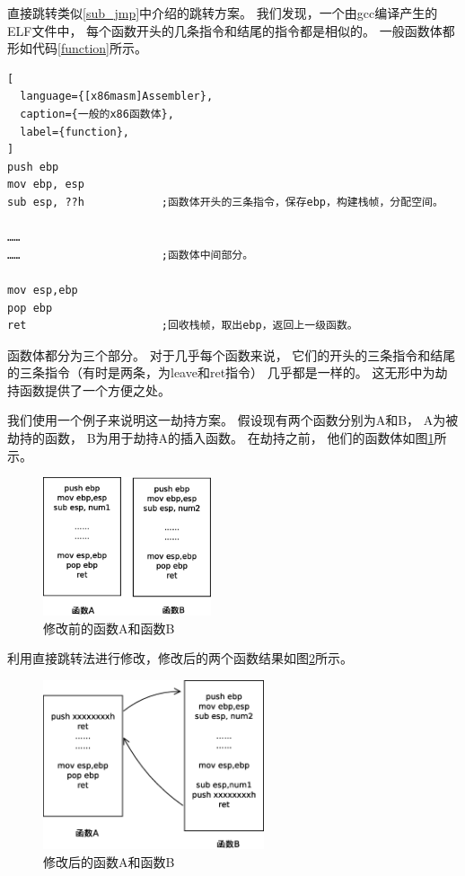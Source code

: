 直接跳转类似\ref{sub_jmp}中介绍的跳转方案。
我们发现，一个由gcc编译产生的ELF文件中，
每个函数开头的几条指令和结尾的指令都是相似的。
一般函数体都形如代码\ref{function}所示。

\begin{lstlisting}[
  language={[x86masm]Assembler},
  caption={一般的x86函数体},
  label={function},
]
push ebp
mov ebp, esp
sub esp, ??h            ;函数体开头的三条指令，保存ebp，构建栈帧，分配空间。

……
……                      ;函数体中间部分。

mov esp,ebp
pop ebp
ret                     ;回收栈帧，取出ebp，返回上一级函数。
\end{lstlisting}

函数体都分为三个部分。
对于几乎每个函数来说，
它们的开头的三条指令和结尾的三条指令（有时是两条，为leave和ret指令）
几乎都是一样的。
这无形中为劫持函数提供了一个方便之处。

我们使用一个例子来说明这一劫持方案。
假设现有两个函数分别为A和B，
A为被劫持的函数，
B为用于劫持A的插入函数。
在劫持之前，
他们的函数体如图\ref{ab0}所示。

\begin{figure}[h!]
    \centering
    \includegraphics[width=0.44\textwidth]{figure/ab0.eps}
    \caption{修改前的函数A和函数B}
    \label{ab0}
\end{figure}

利用直接跳转法进行修改，修改后的两个函数结果如图\ref{ab1}所示。

\begin{figure}[h!]
    \centering
    \includegraphics[width=0.58\textwidth]{figure/ab1.eps}
    \caption{修改后的函数A和函数B}
    \label{ab1}
\end{figure}

